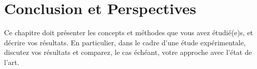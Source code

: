 \chapter{Conclusion et Perspectives}
Ce chapitre doit présenter les concepts et méthodes que vous avez étudié(e)s, et décrire vos résultats. En particulier, dans le cadre d'une étude expérimentale, discutez vos résultats et comparez, le cas échéant, votre approche avec l'état de l'art. 